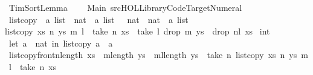 %
\begin{isabellebody}%
%
%
\isadelimtheory
%
\endisadelimtheory
%
\isatagtheory
{}\isamarkupfalse%
\ TimSortLemma\isanewline
\ \ \ \ Main\ {\isachardoublequoteopen}{\isachartilde}{\isachartilde}{\isacharslash}src{\isacharslash}HOL{\isacharslash}Library{\isacharslash}Code{\isacharunderscore}Target{\isacharunderscore}Numeral{\isachardoublequoteclose}\ \isanewline
{}%
\endisatagtheory
{\isafoldtheory}%
%
\isadelimtheory
\isanewline
%
\endisadelimtheory
{}\isamarkupfalse%
\ list{\isacharunderscore}copy\ {\isacharcolon}{\isacharcolon}\ {\isachardoublequoteopen}{\isacharprime}a\ list\ {\isasymRightarrow}\ nat\ {\isasymRightarrow}\ {\isacharprime}a\ list\ \ {\isasymRightarrow}\ nat\ {\isasymRightarrow}\ nat\ {\isasymRightarrow}\ {\isacharprime}a\ list{\isachardoublequoteclose}\ \isanewline
{\isachardoublequoteopen}list{\isacharunderscore}copy\ xs\ n\ ys\ m\ l\ {\isacharequal}\ {\isacharparenleft}take\ n\ xs{\isacharparenright}\ {\isacharat}\ {\isacharparenleft}take\ l\ {\isacharparenleft}drop\ m\ ys{\isacharparenright}{\isacharparenright}\ {\isacharat}\ {\isacharparenleft}drop\ {\isacharparenleft}n{\isacharplus}l{\isacharparenright}\ xs{\isacharparenright}{\isachardoublequoteclose}\isanewline
\isanewline
{}\isamarkupfalse%
\ {\isachardoublequoteopen}{\isacharbrackleft}{}{\isacharcomma}{}{\isacharcomma}{}{\isacharcomma}{}{\isacharcomma}{}{\isacharcolon}{\isacharcolon}int{\isacharbrackright}{\isachardoublequoteclose}\isanewline
\isanewline
{}\isamarkupfalse%
\ {\isachardoublequoteopen}let\ a\ {\isacharequal}\ {\isacharbrackleft}{}{\isacharcolon}{\isacharcolon}nat{\isacharcomma}{}{\isacharcomma}{}{\isacharcomma}{}{\isacharcomma}{}{\isacharbrackright}\ in\ list{\isacharunderscore}copy\ a\ {}\ a\ {}\ {}{\isachardoublequoteclose}\isanewline
\isanewline
\isanewline
{}\isamarkupfalse%
\ list{\isacharunderscore}copy{\isacharunderscore}front{\isacharcolon}{\isachardoublequoteopen}n{\isacharless}length\ xs\ {\isasymand}\ m{\isacharless}length\ ys\ {\isasymand}\ {\isacharparenleft}m{\isacharplus}l{\isacharparenright}{\isasymle}length\ ys\ {\isasymLongrightarrow}\ take\ n\ {\isacharparenleft}list{\isacharunderscore}copy\ xs\ n\ ys\ m\ l{\isacharparenright}\ {\isacharequal}\ take\ n\ xs{\isachardoublequoteclose}\isanewline

\end{isabellebody}
